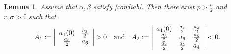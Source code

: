 \documentclass[12pt,reqno,draft]{article}
\numberwithin{equation}{section}
\theoremstyle{theorem}
\newtheorem{lem}[thm]{Lemma}
\theoremstyle{definition}
\begin{document}
\begin{lem}\label{A_1A_2}
 Assume that $\alpha, \beta$ satisfy \eqref{condiab}. 
 Then there exist $p>\frac{n}{2}$ and $r, \sigma>0$ 
 such that
    \begin{align} \label{Syl}
             A_1:=\left|
                    \begin{array}{cc}
                                   a_1(0) & \frac{a_3}{2}
                    \\
                        \frac{a_3}{2} & a_6
                    \end{array}
                    \right|>0
    \quad
             {\rm and}
    \quad
             A_2:=\left|
                    \begin{array}{ccc}
                                   a_1(0) & \frac{a_3}{2} & \frac{a_2}{2}
                    \\
                        \frac{a_3}{2} &            a_6 & \frac{a_5}{2}
                    \\
                        \frac{a_2}{2} & \frac{a_5}{2} &            a_4
                    \end{array}
                    \right| <0.
    \end{align}
\end{lem}
\end{document}
